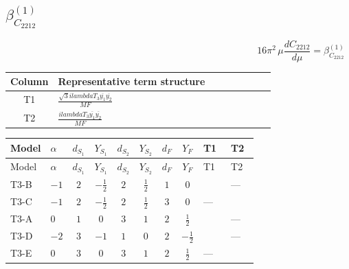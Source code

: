 \documentclass[8pt]{article}
\begin{document}
\begin{landscape}
\section*{$\beta_{C_{2212}}^{(1)}$}
\[16\pi^2\,\mu\frac{d C_{2212}}{d\mu}=\beta_{C_{2212}}^{(1)}\]
\begin{center}
\begin{tabular}{@{}c >{\raggedright\arraybackslash}p{0.82\linewidth}@{}}
\toprule
Column & Representative term structure \\
\midrule
T1 & \(\displaystyle \frac{\sqrt{3} i lambdaT_{3} \overline{y_{1}} \overline{y_{2}}}{MF}\) \\
\midrule
T2 & \(\displaystyle \frac{i lambdaT_{3} \overline{y_{1}} \overline{y_{2}}}{MF}\) \\
\midrule
\bottomrule
\end{tabular}
\end{center}
\smallskip
\tiny
\begin{longtable}{@{}llcccccc >{\raggedright\arraybackslash}p{0.21\linewidth} >{\raggedright\arraybackslash}p{0.21\linewidth}@{}}
\toprule
Model & $\alpha$ & $d_{S_1}$ & $Y_{S_1}$ & $d_{S_2}$ & $Y_{S_2}$ & $d_F$ & $Y_F$ & T1 & T2 \\
\midrule
\endfirsthead
\toprule
Model & $\alpha$ & $d_{S_1}$ & $Y_{S_1}$ & $d_{S_2}$ & $Y_{S_2}$ & $d_F$ & $Y_F$ & T1 & T2 \\
\midrule
\endhead
T3-B & $-1$ & $2$ & $-\frac{1}{2}$ & $2$ & $\frac{1}{2}$ & $1$ & $0$ & \scriptsize\adjustbox{max width=\linewidth}{$\begin{gathered} \frac{2 \sqrt{3} i lambdaT_{3} \overline{y_{1}} \overline{y_{2}}}{3 MF}\end{gathered}$} & --- \\
\midrule
T3-C & $-1$ & $2$ & $-\frac{1}{2}$ & $2$ & $\frac{1}{2}$ & $3$ & $0$ & --- & \scriptsize\adjustbox{max width=\linewidth}{$\begin{gathered} - \frac{4 i lambdaT_{3} \overline{y_{1}} \overline{y_{2}}}{3 MF}\end{gathered}$} \\
\midrule
T3-A & $0$ & $1$ & $0$ & $3$ & $1$ & $2$ & $\frac{1}{2}$ & \scriptsize\adjustbox{max width=\linewidth}{$\begin{gathered} \frac{2 \sqrt{3} i lambdaT_{3} \overline{y_{1}} \overline{y_{2}}}{3 MF}\end{gathered}$} & --- \\
\midrule
T3-D & $-2$ & $3$ & $-1$ & $1$ & $0$ & $2$ & $-\frac{1}{2}$ & \scriptsize\adjustbox{max width=\linewidth}{$\begin{gathered} \frac{2 \sqrt{3} i lambdaT_{3} \overline{y_{1}} \overline{y_{2}}}{3 MF}\end{gathered}$} & --- \\
\midrule
T3-E & $0$ & $3$ & $0$ & $3$ & $1$ & $2$ & $\frac{1}{2}$ & --- & \scriptsize\adjustbox{max width=\linewidth}{$\begin{gathered} - \frac{2 i lambdaT_{3} \overline{y_{1}} \overline{y_{2}}}{MF}\end{gathered}$} \\
\midrule
\bottomrule
\end{longtable}
\clearpage

\end{landscape}
\end{document}
